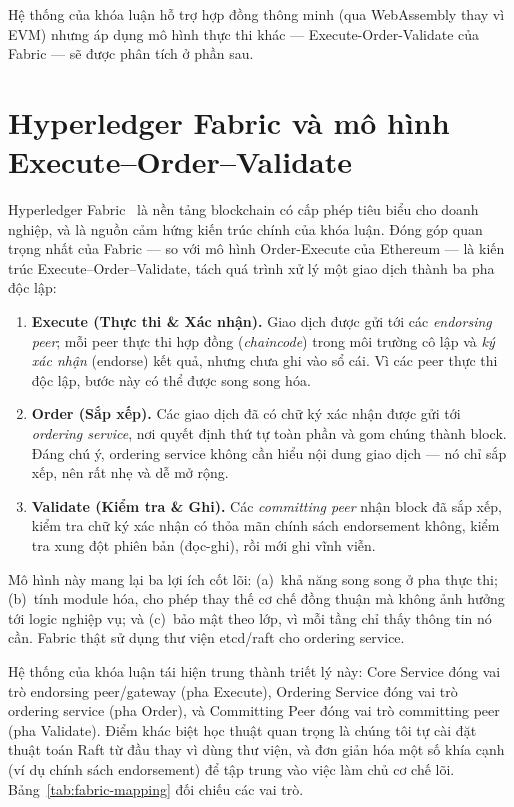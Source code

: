 Hệ thống của khóa luận hỗ trợ hợp đồng thông minh (qua WebAssembly thay vì EVM)
nhưng áp dụng mô hình thực thi khác --- Execute-Order-Validate của Fabric --- sẽ
được phân tích ở phần sau.

\section{Hyperledger Fabric và mô hình Execute--Order--Validate}
\label{sec:fabric}

Hyperledger Fabric~\cite{androulaki2018hyperledger} là nền tảng blockchain có
cấp phép tiêu biểu cho doanh nghiệp, và là nguồn cảm hứng kiến trúc
chính của khóa luận. Đóng góp quan trọng nhất của Fabric --- so với mô hình
Order-Execute của Ethereum --- là kiến trúc Execute--Order--Validate,
tách quá trình xử lý một giao dịch thành ba pha độc lập:

\begin{enumerate}
  \item \textbf{Execute (Thực thi \& Xác nhận).} Giao dịch được gửi tới các
  \textit{endorsing peer}; mỗi peer thực thi hợp đồng (\textit{chaincode})
  trong môi trường cô lập và \textit{ký xác nhận} (endorse) kết quả, nhưng
  chưa ghi vào sổ cái. Vì các peer thực thi độc lập, bước này có thể
  được song song hóa.
  \item \textbf{Order (Sắp xếp).} Các giao dịch đã có chữ ký xác nhận được gửi
  tới \textit{ordering service}, nơi quyết định thứ tự toàn phần và gom chúng
  thành block. Đáng chú ý, ordering service không cần hiểu nội dung
  giao dịch --- nó chỉ sắp xếp, nên rất nhẹ và dễ mở rộng.
  \item \textbf{Validate (Kiểm tra \& Ghi).} Các \textit{committing peer} nhận
  block đã sắp xếp, kiểm tra chữ ký xác nhận có thỏa mãn chính sách endorsement
  không, kiểm tra xung đột phiên bản (đọc-ghi), rồi mới ghi vĩnh viễn.
\end{enumerate}

Mô hình này mang lại ba lợi ích cốt lõi: (a)~khả năng song song ở pha
thực thi; (b)~tính module hóa, cho phép thay thế cơ chế đồng thuận mà
không ảnh hưởng tới logic nghiệp vụ; và (c)~bảo mật theo lớp, vì mỗi
tầng chỉ thấy thông tin nó cần. Fabric thật sử dụng thư viện
etcd/raft cho ordering service.

Hệ thống của khóa luận tái hiện trung thành triết lý này: Core Service
đóng vai trò endorsing peer/gateway (pha Execute), Ordering Service đóng vai trò
ordering service (pha Order), và Committing Peer đóng vai trò committing peer
(pha Validate). Điểm khác biệt học thuật quan trọng là chúng tôi
tự cài đặt thuật toán Raft từ đầu thay vì dùng thư viện, và đơn giản
hóa một số khía cạnh (ví dụ chính sách endorsement) để tập trung vào việc làm
chủ cơ chế lõi. Bảng~\ref{tab:fabric-mapping} đối chiếu các vai trò.

